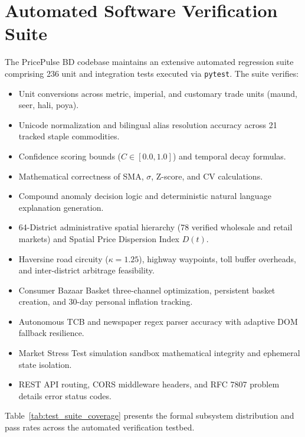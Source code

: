 \section{Automated Software Verification Suite}
The PricePulse BD codebase maintains an extensive automated regression suite comprising 236 unit and integration tests executed via \texttt{pytest}. The suite verifies:
\begin{itemize}
    \item Unit conversions across metric, imperial, and customary trade units (maund, seer, hali, poya).
    \item Unicode normalization and bilingual alias resolution accuracy across 21 tracked staple commodities.
    \item Confidence scoring bounds ($C \in [0.0, 1.0]$) and temporal decay formulas.
    \item Mathematical correctness of SMA, $\sigma$, Z-score, and CV calculations.
    \item Compound anomaly decision logic and deterministic natural language explanation generation.
    \item 64-District administrative spatial hierarchy (78 verified wholesale and retail markets) and Spatial Price Dispersion Index $D(t)$.
    \item Haversine road circuity ($\kappa=1.25$), highway waypoints, toll buffer overheads, and inter-district arbitrage feasibility.
    \item Consumer Bazaar Basket three-channel optimization, persistent basket creation, and 30-day personal inflation tracking.
    \item Autonomous TCB and newspaper regex parser accuracy with adaptive DOM fallback resilience.
    \item Market Stress Test simulation sandbox mathematical integrity and ephemeral state isolation.
    \item REST API routing, CORS middleware headers, and RFC 7807 problem details error status codes.
\end{itemize}

Table~\ref{tab:test_suite_coverage} presents the formal subsystem distribution and pass rates across the automated verification testbed.

